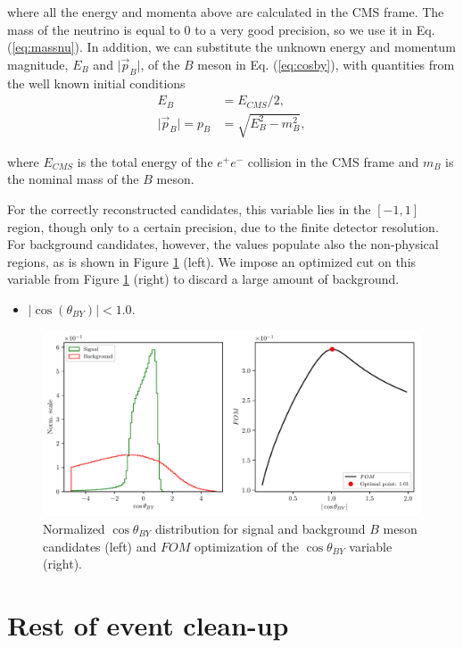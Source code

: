 \documentclass[oneside,a4paper,openany,12pt]{scrbook}
\begin{document}
where all the energy and momenta above are calculated in the CMS frame. The mass of the neutrino is equal to 0 to a very good precision, so we use it in Eq. (\ref{eq:massnu}). In addition, we can substitute the unknown energy and momentum magnitude, $E_B$ and $\vert \vec{p}_B \vert$, of the $B$ meson in Eq. (\ref{eq:cosby}), with quantities from the well known initial conditions
\begin{align}
E_B &= E_{CMS} / 2,\\
\vert \vec{p}_B \vert = p_B &= \sqrt{E_B^2 - m_B^2},
\end{align} 

where $E_{CMS}$ is the total energy of the $e^+e^-$ collision in the CMS frame and $m_B$ is the nominal mass of the $B$ meson. 

For the correctly reconstructed candidates, this variable lies in the $[-1,1]$ region, though only to a certain precision, due to the finite detector resolution. For background candidates, however, the values populate also the non-physical regions, as is shown in Figure \ref{fig:cosby} (left). We impose an optimized cut on this variable from Figure \ref{fig:cosby} (right) to discard a large amount of background.
\begin{itemize}
\item $\vert \cos \left(\theta_{BY}\right) \vert < 1.0$.
\end{itemize}

\begin{figure}[H]
\centering
\captionsetup{width=.8\linewidth}
\includegraphics[width=\linewidth]{fig/cosBY}
\caption{Normalized $\cos \theta_{BY}$ distribution for signal and background $B$ meson candidates (left) and $FOM$ optimization of the $\cos \theta_{BY}$ variable (right).}
\label{fig:cosby}
\end{figure}

\section{Rest of event clean-up}
\label{sc:shortroe}
\end{document}
